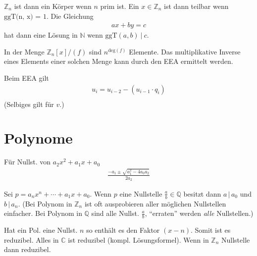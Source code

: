 \documentclass{article}
\begin{document}
\begin{multicols}{2}
$\mathbb{Z}_n$ ist dann ein Körper wenn $n$ prim ist. Ein $x \in \mathbb{Z}_n$ ist dann teilbar wenn $\text{ggT(n, x) = 1}$. Die Gleichung
\begin{align*}
    ax + by = c
\end{align*}
hat dann eine Lösung in $\mathbb{N}$ wenn $\text{ggT}(a, b)\ |\ c$.

In der Menge $\mathbb{Z}_n[x]/(f)$ sind $n^{\text{deg}(f)}$ Elemente. Das multiplikative Inverse eines Elements einer solchen Menge kann durch den EEA ermittelt werden.

Beim EEA gilt
\begin{align*}
    u_i = u_{i - 2} - (u_{i - 1} \cdot q_{i}) \\
\end{align*}
(Selbiges gilt für $v$.)

\section*{Polynome}

Für Nullst. von $a_2x^2 + a_1x + a_0$
\begin{align*}
    \frac{-a_1 \pm \sqrt{a_1^2 - 4a_0a_2}}{2a_2}
\end{align*}

Sei $p = a_nx^n + \cdots + a_1x + a_0$. Wenn $p$ eine Nullstelle $\frac{a}{b} \in \mathbb{Q}$ besitzt dann $a\,|\,a_0$ und $b\,|\,a_n$. (Bei Polynom in $\mathbb{Z}_n$ ist oft ausprobieren aller möglichen Nullstellen einfacher. Bei Polynom in $\mathbb{Q}$ sind alle Nullst. $\frac{a}{b}$, \enquote{erraten} werden \emph{alle} Nullstellen.) 

Hat ein Pol. eine Nullst. $n$ so enthält es den Faktor $(x - n)$. Somit ist es reduzibel. Alles in $\mathbb{C}$ ist reduzibel (kompl. Lösungsformel). Wenn in $\mathbb{Z}_n$ Nullstelle dann reduzibel.

\end{multicols}
\end{document}
